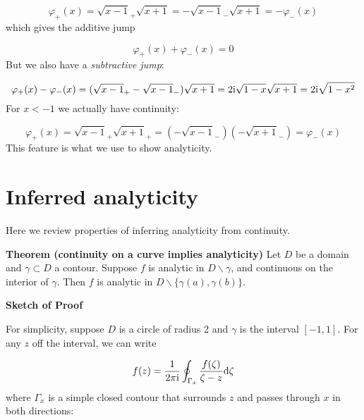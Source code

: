 \documentclass[12pt,a4paper]{article}
\def\D{ {\rm d} }
\def\I{ {\rm i} }
\begin{document}
\[
\varphi_+(x) = \sqrt{x-1}_+ \sqrt{x+1} = - \sqrt{x-1}_- \sqrt{x+1} = -\varphi_-(x)
\]
which gives the additive jump

\[
\varphi_+(x) + \varphi_-(x) = 0
\]
But we also have a \emph{subtractive jump}:

\[
\varphi_+(x) - \varphi_-(x) = (\sqrt{x-1}_+ - \sqrt{x-1}_-) \sqrt{x+1} = 2\I \sqrt{1-x}\sqrt{x+1} = 2\I \sqrt{1 - x^2}
\]
For $x < -1$ we actually have continuity:

\[
\varphi_+(x) = \sqrt{x-1}_+ \sqrt{x+1}_+ = (- \sqrt{x-1}_-)(- \sqrt{x+1}_-) = \varphi_-(x)
\]
This feature is what we use to show analyticity.

\section{Inferred analyticity}
Here we review properties of inferring analyticity from continuity.

\textbf{Theorem (continuity on a curve implies analyticity)} Let $D$ be a domain and $\gamma \subset D$ a contour. Suppose $f$ is analytic in $D \backslash \gamma$, and continuous on the interior of $\gamma$. Then $f$ is analytic in $D \backslash \{\gamma(a), \gamma(b) \}$.

\textbf{Sketch of Proof}

For simplicity, suppose $D$ is a circle of radius 2 and $\gamma$ is the interval $[-1,1]$. For any $z$ off the interval, we can write

\[
f(z) = {1 \over 2 \pi \I} \oint_{\Gamma_x} {f(\zeta) \over  \zeta - z} \D\zeta
\]
where $\Gamma_x$ is a simple closed contour that surrounds $z$ and passes through $x$ in both directions:
\end{document}
